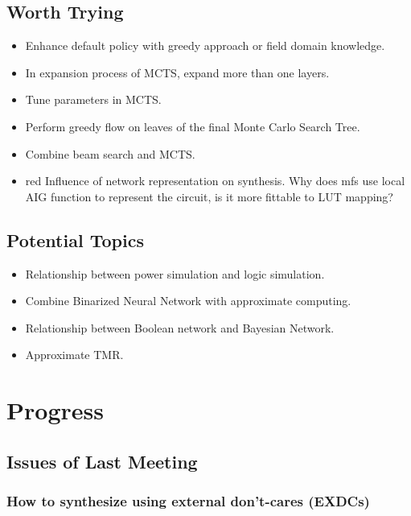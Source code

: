 \documentclass{rpt}
\begin{document}
\subsection{Worth Trying}
\begin{itemize}
    \item Enhance default policy with greedy approach or field domain knowledge.
    \item In expansion process of MCTS, expand more than one layers.
    \item Tune parameters in MCTS\@.
    \item Perform greedy flow on leaves of the final Monte Carlo Search Tree.
    \item Combine beam search and MCTS\@.
    \item
        \begin{color}{red}
        Influence of network representation on synthesis.
        Why does mfs use local AIG function to represent the circuit,
        is it more fittable to LUT mapping?
        \end{color}
\end{itemize}

\subsection{Potential Topics}
\begin{itemize}
    \item Relationship between power simulation and logic simulation.
    \item Combine Binarized Neural Network with approximate computing.
    \item Relationship between Boolean network and Bayesian Network.
    \item Approximate TMR\@.
\end{itemize}

\section{Progress}

\subsection{Issues of Last Meeting}

\subsubsection*{How to synthesize using external don't-cares (EXDCs)}
\end{document}

